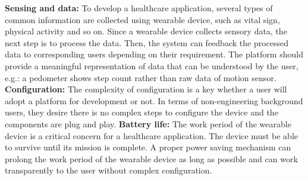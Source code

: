 \newline
\textbf{Sensing and data:}\newline
To develop a healthcare application, several types of common information are collected using wearable device, such as vital sign, physical activity and so on. Since a wearable device collects sensory data, the next step is to process the data. Then, the system can feedback the processed data to corresponding users depending on their requirement. The platform should provide a meaningful representation of data that can be understood by the user, e.g.: a pedometer shows step count rather than raw data of motion sensor.
\vspace{10pt}
\newline
\textbf{Configuration:}\newline
The complexity of configuration is a key whether a user will adopt a platform for development or not. In terms of non-engineering background users, they desire there is no complex steps to configure the device and the components are plug and play.
\vspace{10pt}
\newline
\textbf{Battery life:}\newline
The work period of the wearable device is a critical concern for a healthcare application. The device must be able to survive until its mission is complete. A proper power saving mechanism can prolong the work period of the wearable device as long as possible and can work transparently to the user without complex configuration.

